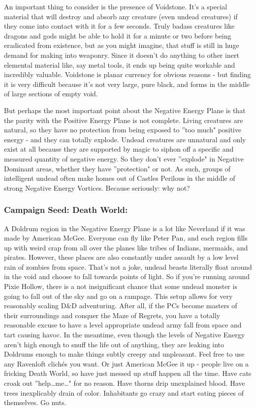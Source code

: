 An important thing to consider is the presence of Voidstone. It's a special material that will destroy and absorb any creature (even undead creatures) if they come into contact with it for a few seconds. Truly badass creatures like dragons and gods might be able to hold it for a minute or two before being eradicated from existence, but as you might imagine, that stuff is still in huge demand for making into weaponry. Since it doesn't do anything to other inert elemental material like, say metal tools, it ends up being quite workable and incredibly valuable. Voidstone is planar currency for obvious reasons - but finding it is very difficult because it's not very large, pure black, and forms in the middle of large sections of empty void.

But perhaps the most important point about the Negative Energy Plane is that the parity with the Positive Energy Plane is not complete. Living creatures are natural, so they have no protection from being exposed to ''too much" positive energy - and they can totally explode. Undead creatures are unnatural and only exist at all because they are supported by magic to siphon off a specific and measured quantity of negative energy. So they don't ever ''explode" in Negative Dominant areas, whether they have ''protection" or not. As such, groups of intelligent undead often make homes out of Castles Perilous in the middle of strong Negative Energy Vortices. Because seriously: why not?

\subsubsection{Campaign Seed: Death World:} A Doldrum region in the Negative Energy Plane is a lot like Neverland if it was made by American McGee. Everyone can fly like Peter Pan, and each region fills up with weird crap from all over the planes like tribes of Indians, mermaids, and pirates. However, these places are also constantly under assault by a low level rain of zombies from space. That's not a joke, undead beasts literally float around in the void and choose to fall towards points of light. So if you're running around Pixie Hollow, there is a not insignificant chance that some undead monster is going to fall out of the sky and go on a rampage. This setup allows for very reasonably scaling D\&D adventuring. After all, if the PCs become masters of their surroundings and conquer the Maze of Regrets, you have a totally reasonable excuse to have a level appropriate undead army fall from space and tart causing havoc. In the meantime, even though the levels of Negative Energy aren't high enough to snuff the life out of anything, they are leaking into Doldrums enough to make things subtly creepy and unpleasant. Feel free to use any Ravenloft clichés you want. Or just American McGee it up - people live on a fricking Death World, so have just messed up stuff happen all the time. Have cats croak out ''help\ldots me\ldots" for no reason. Have thorns drip unexplained blood. Have trees inexplicably drain of color. Inhabitants go crazy and start eating pieces of themselves. Go nuts.

